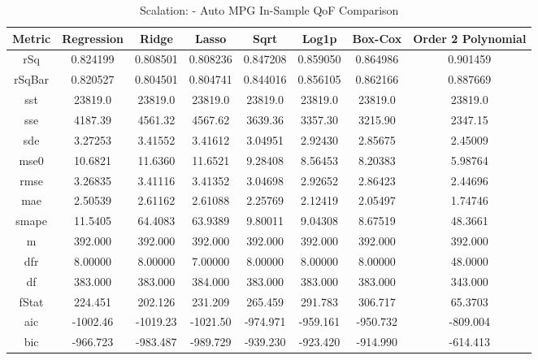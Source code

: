 \documentclass{article}
\begin{document}
\begin{table}[H]
\centering
\caption{Scalation: - Auto MPG In-Sample QoF Comparison}
\label{tab:Scalation: - Auto MPG In-Sample QoF Comparison}
\begin{tabular}{|c|c|c|c|c|c|c|c|} \hline 
Metric & Regression & Ridge & Lasso & Sqrt & Log1p &  Box-Cox & Order 2 Polynomial \\ \hline \hline 
rSq &0.824199 & 0.808501 &      0.808236 &      0.847208 &      0.859050 &      0.864986 &      0.901459 \\ \hline 
rSqBar &0.820527 &      0.804501 &      0.804741 &      0.844016 &      0.856105 &      0.862166 &      0.887669 \\ \hline 
sst &23819.0 &  23819.0 &       23819.0 &       23819.0 &       23819.0 &       23819.0 &       23819.0 \\ \hline 
sse &4187.39 &  4561.32 &       4567.62 &       3639.36 &       3357.30 &       3215.90 &       2347.15 \\ \hline 
sde &3.27253 &  3.41552 &       3.41612 &       3.04951 &       2.92430 &       2.85675 &       2.45009 \\ \hline 
mse0 &10.6821 & 11.6360 &       11.6521 &       9.28408 &       8.56453 &       8.20383 &       5.98764 \\ \hline 
rmse &3.26835 & 3.41116 &       3.41352 &       3.04698 &       2.92652 &       2.86423 &       2.44696 \\ \hline 
mae &2.50539 &  2.61162 &       2.61088 &       2.25769 &       2.12419 &       2.05497 &       1.74746 \\ \hline 
smape &11.5405 &        64.4083 &       63.9389 &       9.80011 &       9.04308 &       8.67519 &       48.3661 \\ \hline 
m &392.000 &    392.000 &       392.000 &       392.000 &       392.000 &       392.000 &       392.000 \\ \hline 
dfr &8.00000 &  8.00000 &       7.00000 &       8.00000 &       8.00000 &       8.00000 &       48.0000 \\ \hline 
df &383.000 &   383.000 &       384.000 &       383.000 &       383.000 &       383.000 &       343.000 \\ \hline 
fStat &224.451 &        202.126 &       231.209 &       265.459 &       291.783 &       306.717 &       65.3703 \\ \hline 
aic &-1002.46 & -1019.23 &      -1021.50 &      -974.971 &      -959.161 &      -950.732 &      -809.004 \\ \hline 
bic &-966.723 & -983.487 &      -989.729 &      -939.230 &      -923.420 &      -914.990 &      -614.413 \\ \hline 
\end{tabular}
\end{table}
\end{document}
